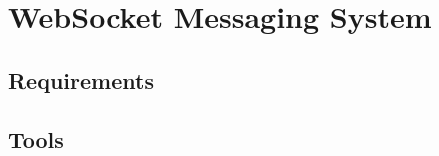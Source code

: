 \chapter{WebSocket Messaging System}
\label{chapter:websocketMessagingSystem}

\section{Requirements}

\section{Tools}